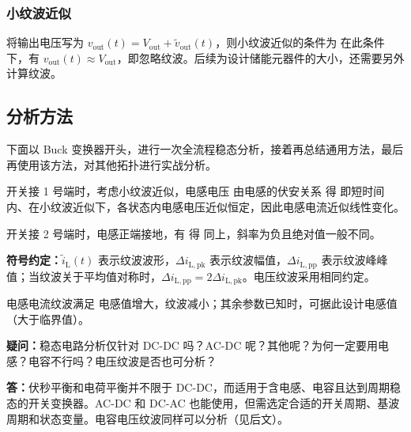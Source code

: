 \subsubsection{小纹波近似}

将输出电压写为 $v_{\mathrm{out}}(t)=V_{\mathrm{out}}+\widetilde{v}_{\mathrm{out}}(t)$，则小纹波近似的条件为
在此条件下，有 $v_{\mathrm{out}}(t)\approx V_{\mathrm{out}}$，即忽略纹波。后续为设计储能元器件的大小，还需要另外计算纹波。

\newpage{}

\subsection{分析方法}

下面以 Buck 变换器开头，进行一次全流程稳态分析，接着再总结通用方法，最后再使用该方法，对其他拓扑进行实战分析。




开关接 1 号端时，考虑小纹波近似，电感电压
由电感的伏安关系
得
即短时间内、在小纹波近似下，各状态内电感电压近似恒定，因此电感电流近似线性变化。

开关接 2 号端时，电感正端接地，有
得
同上，斜率为负且绝对值一般不同。


\textbf{符号约定：}$\widetilde{i}_{\mathrm{L}}(t)$ 表示纹波波形，$\Delta i_{\mathrm{L,pk}}$ 表示纹波幅值，$\Delta i_{\mathrm{L,pp}}$ 表示纹波峰峰值；当纹波关于平均值对称时，$\Delta i_{\mathrm{L,pp}}=2\Delta i_{\mathrm{L,pk}}$。电压纹波采用相同约定。


电感电流纹波满足
电感值增大，纹波减小；其余参数已知时，可据此设计电感值（大于临界值）。

\textbf{疑问：}稳态电路分析仅针对 DC-DC 吗？AC-DC 呢？其他呢？为何一定要用电感？电容不行吗？电压纹波是否也可分析？

\textbf{答：}伏秒平衡和电荷平衡并不限于 DC-DC，而适用于含电感、电容且达到周期稳态的开关变换器。AC-DC 和 DC-AC 也能使用，但需选定合适的开关周期、基波周期和状态变量。电容电压纹波同样可以分析（见后文）。


